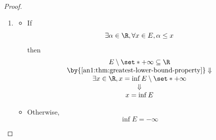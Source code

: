 \begin{proof}
\begin{itemize}
\begin{enumerate}[label=\textbf{(\Alph*)}]
\begin{itemize}
                    \item Otherwise,
                          \[
                            \sup E = + \infty
                          \]
                  \end{itemize}
            \item \begin{itemize}
                    \item If
                          \[
                            \exists \alpha \in \R, \forall x \in E, \alpha \leq x
                          \]
                          then
                          \[
                            \begin{array}{c}
                              E \setminus \set*{+ \infty} \subseteq \R                     \\
                              \by{\Cref{an1:thm:greatest-lower-bound-property}} \Downarrow \\
                              \exists x \in \R, x = \inf E \setminus \set*{+ \infty}       \\
                              \Downarrow                                                   \\
                              x = \inf E
                            \end{array}
                          \]
                    \item Otherwise,
                          \[
                            \inf E = - \infty
                          \]
                  \end{itemize}
          \end{enumerate}
  \end{itemize}
\end{proof}
